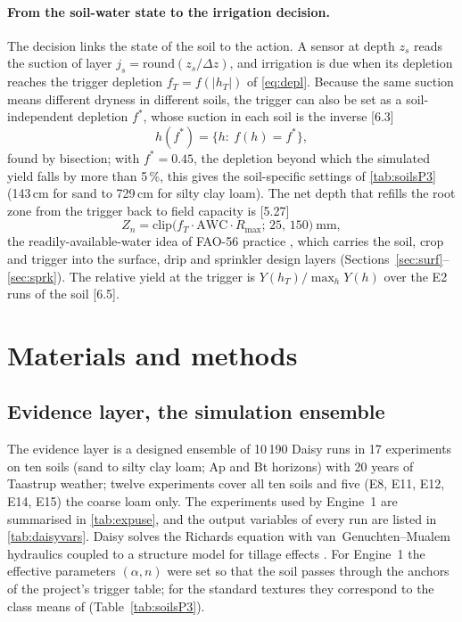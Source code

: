 \documentclass[preprint,12pt]{elsarticle}
\begin{document}
\paragraph{From the soil-water state to the irrigation decision.}
\label{sec:sys-decision}
The decision links the state of the soil to the action. A sensor at depth $z_s$ reads the suction of layer $j_s=\mathrm{round}(z_s/\Delta z)$, and irrigation is due when its depletion reaches the trigger depletion $f_T=f(|h_T|)$ of \cref{eq:depl}. Because the same suction means different dryness in different soils, the trigger can also be set as a soil-independent depletion $f^\ast$, whose suction in each soil is the inverse [6.3]
\begin{equation}
h(f^\ast)=\{h:\ f(h)=f^\ast\},
\label{eq:invdepl}
\end{equation}
found by bisection; with $f^\ast=0.45$, the depletion beyond which the simulated yield falls by more than 5\,\%, this gives the soil-specific settings of \cref{tab:soilsP3} (143\,cm for sand to 729\,cm for silty clay loam). The net depth that refills the root zone from the trigger back to field capacity is [5.27]
\begin{equation}
Z_n=\mathrm{clip}\bigl(f_T\cdot\mathrm{AWC}\cdot R_{\max};\,25,\,150\bigr)\ \mathrm{mm},
\label{eq:Zn}
\end{equation}
the readily-available-water idea of FAO-56 practice \cite{Allen1998}, which carries the soil, crop and trigger into the surface, drip and sprinkler design layers (Sections~\ref{sec:surf}--\ref{sec:sprk}). The relative yield at the trigger is $Y(h_T)/\max_hY(h)$ over the E2 runs of the soil [6.5].


\section{Materials and methods}
\label{sec:methods}
\subsection{Evidence layer, the simulation ensemble}
The evidence layer is a designed ensemble of 10\,190 Daisy runs \cite{Hansen2012,Holbak2026} in 17 experiments on ten soils (sand to silty clay loam; Ap and Bt horizons) with 20 years of Taastrup weather; twelve experiments cover all ten soils and five (E8, E11, E12, E14, E15) the coarse loam only. The experiments used by Engine~1 are summarised in \cref{tab:expuse}, and the output variables of every run are listed in \cref{tab:daisyvars}. Daisy solves the Richards equation with van~Genuchten--Mualem hydraulics \cite{vanGenuchten1980,Mualem1976} coupled to a structure model for tillage effects \cite{Flanagan1995}. For Engine~1 the effective parameters $(\alpha,n)$ were set so that the soil passes through the anchors of the project's trigger table; for the standard textures they correspond to the class means of \cite{Carsel1988} (Table~\ref{tab:soilsP3}).
\end{document}
